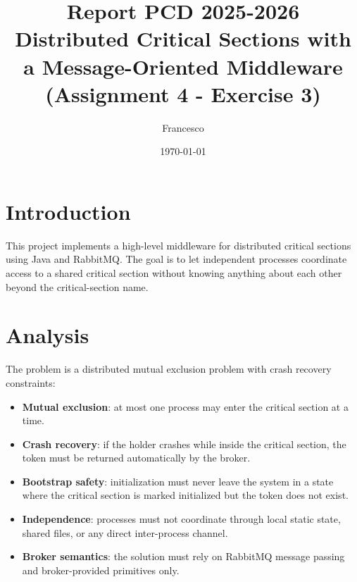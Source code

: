 \documentclass[11pt,a4paper]{article}
\title{Report PCD 2025-2026 \\ Distributed Critical Sections with a Message-Oriented Middleware (Assignment 4 - Exercise 3)}
\author{Francesco}
\date{\today}
\begin{document}
\maketitle

\section{Introduction}
This project implements a high-level middleware for distributed critical sections using Java and RabbitMQ.
The goal is to let independent processes coordinate access to a shared critical section without knowing
anything about each other beyond the critical-section name.

\section{Analysis}
The problem is a distributed mutual exclusion problem with crash recovery constraints:
\begin{itemize}
    \item \textbf{Mutual exclusion}: at most one process may enter the critical section at a time.
    \item \textbf{Crash recovery}: if the holder crashes while inside the critical section, the token must be
    returned automatically by the broker.
    \item \textbf{Bootstrap safety}: initialization must never leave the system in a state where the critical
    section is marked initialized but the token does not exist.
    \item \textbf{Independence}: processes must not coordinate through local static state, shared files, or any
    direct inter-process channel.
    \item \textbf{Broker semantics}: the solution must rely on RabbitMQ message passing and broker-provided
    primitives only.
\end{itemize}
\end{document}
